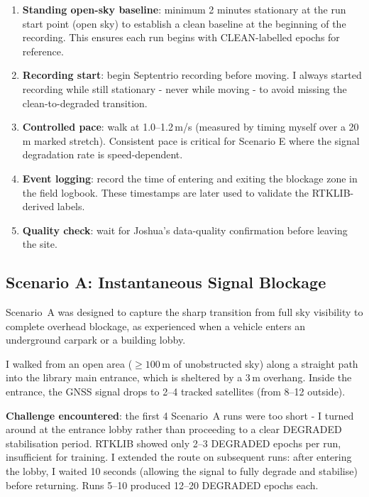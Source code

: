 \documentclass[12pt,a4paper]{article}
\begin{document}
\begin{enumerate}
  \item \textbf{Standing open-sky baseline}: minimum 2 minutes stationary at the run
    start point (open sky) to establish a clean baseline at the beginning of the
    recording. This ensures each run begins with CLEAN-labelled epochs for reference.
  \item \textbf{Recording start}: begin Septentrio recording before moving.
    I always started recording while still stationary - never while moving - 
    to avoid missing the clean-to-degraded transition.
  \item \textbf{Controlled pace}: walk at 1.0--1.2\,m/s (measured by timing myself
    over a 20\,m marked stretch). Consistent pace is critical for Scenario E where
    the signal degradation rate is speed-dependent.
  \item \textbf{Event logging}: record the time of entering and exiting the blockage
    zone in the field logbook. These timestamps are later used to validate the
    RTKLIB-derived labels.
  \item \textbf{Quality check}: wait for Joshua's data-quality confirmation before
    leaving the site.
\end{enumerate}

\subsection{Scenario A: Instantaneous Signal Blockage}

Scenario~A was designed to capture the sharp transition from full sky visibility to
complete overhead blockage, as experienced when a vehicle enters an underground carpark
or a building lobby.

I walked from an open area ($\geq 100$\,m of unobstructed sky) along a straight path
into the library main entrance, which is sheltered by a 3\,m overhang.
Inside the entrance, the GNSS signal drops to 2--4 tracked satellites
(from 8--12 outside).

\textbf{Challenge encountered}: the first 4 Scenario~A runs were too short - I turned
around at the entrance lobby rather than proceeding to a clear DEGRADED stabilisation
period.
RTKLIB showed only 2--3 DEGRADED epochs per run, insufficient for training.
I extended the route on subsequent runs: after entering the lobby, I waited 10 seconds
(allowing the signal to fully degrade and stabilise) before returning.
Runs 5--10 produced 12--20 DEGRADED epochs each.
\end{document}
